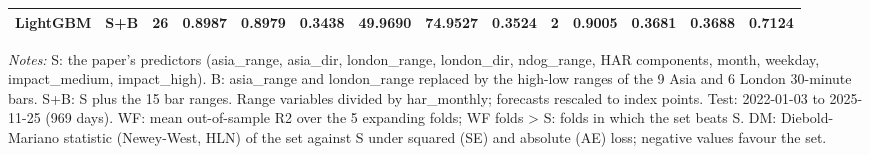 \begin{table}[htbp]
{\begin{tabular}{llrrrrrrrrrrrr}
LightGBM & S+B & 26 & 0.8987 & 0.8979 & 0.3438 & 49.9690 & 74.9527 & 0.3524 & 2 & 0.9005 & 0.3681 & 0.3688 & 0.7124 \\
\bottomrule
\end{tabular}%
}
\par\vspace{2pt}\footnotesize\textit{Notes:} S: the paper's predictors (asia\_range, asia\_dir, london\_range, london\_dir, ndog\_range, HAR components, month, weekday, impact\_medium, impact\_high). B: asia\_range and london\_range replaced by the high-low ranges of the 9 Asia and 6 London 30-minute bars. S+B: S plus the 15 bar ranges. Range variables divided by har\_monthly; forecasts rescaled to index points. Test: 2022-01-03 to 2025-11-25 (969 days). WF: mean out-of-sample R2 over the 5 expanding folds; WF folds > S: folds in which the set beats S. DM: Diebold-Mariano statistic (Newey-West, HLN) of the set against S under squared (SE) and absolute (AE) loss; negative values favour the set.
\end{table}
